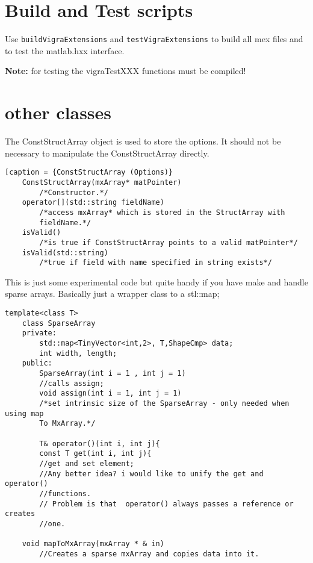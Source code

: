 \documentclass[a4paper,10pt]{article}
\begin{document}
\section{Build and Test scripts}
Use \verb+buildVigraExtensions+ and \verb+testVigraExtensions+ to build all mex files and to test the 
matlab.hxx interface.

\textbf{Note:} for testing the vigraTestXXX functions must be compiled!

\section{other classes}
The ConstStructArray object is used to store the options.
It should not be necessary to manipulate the ConstStructArray directly.
\begin{lstlisting}[caption = {ConstStructArray (Options)}
	ConstStructArray(mxArray* matPointer)
		/*Constructor.*/
	operator[](std::string fieldName)
		/*access mxArray* which is stored in the StructArray with 
		fieldName.*/
	isValid()
		/*is true if ConstStructArray points to a valid matPointer*/
	isValid(std::string)
		/*true if field with name specified in string exists*/
\end{lstlisting}


	This is just some experimental code but quite handy if you have make 
	and handle sparse arrays. Basically just a wrapper class to a stl::map;
\begin{lstlisting}[caption = {Sparse array}]
    template<class T>
    class SparseArray
    private:
        std::map<TinyVector<int,2>, T,ShapeCmp> data;
        int width, length;
    public:
        SparseArray(int i = 1 , int j = 1)
	    //calls assign;
        void assign(int i = 1, int j = 1)
	    /*set intrinsic size of the SparseArray - only needed when using map
	    To MxArray.*/

    	T& operator()(int i, int j){
    	const T get(int i, int j){
	    //get and set element;
	    //Any better idea? i would like to unify the get and operator() 
	    //functions.
	    // Problem is that  operator() always passes a reference or creates 
	    //one.

	void mapToMxArray(mxArray * & in)
	    //Creates a sparse mxArray and copies data into it.
\end{lstlisting}
\end{document}
